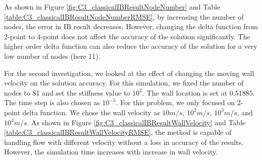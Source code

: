 As shown in Figure \ref{fig:C3_classicalIBResultNodeNumber} and Table \ref{table:C3_classicalIBResultNodeNumberRMSE}, by increasing the number of nodes, the error in IB result decreases. However, changing the delta function from 2-point to 4-point does not affect the accuracy of the solution significantly. The higher order delta function can also reduce the accuracy of the solution for a very low number of nodes (here 11). 

For the second investigation, we looked at the effect of changing the moving wall velocity on the solution accuracy. For this simulation, we fixed the number of nodes to 81 and set the stiffness value to $10^2$. The wall location is set at $0.51885$. The time step is also chosen as $10^{-5}$. For this problem, we only focused on 2-point delta function. We chose the wall velocity as $10 m/s$, $10^2 m/s$, $10^3 m/s$, and $10^4 m/s$. As shown in Figure \ref{fig:C3_classicalIBResultWallVelocity} and Table \ref{table:C3_classicalIBResultWallVelocityRMSE}, the method is capable of handling flow with different velocity without a loss in accuracy of the results. However, the simulation time increases with increase in wall velocity.

